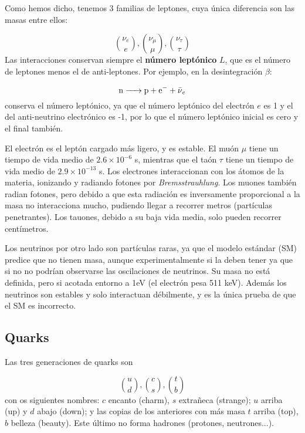 Como hemos dicho, tenemos 3 familias de leptones, cuya única diferencia son las masas entre ellos:

\begin{equation}
	\binom{\nu_e}{e} , 
	\binom{\nu_\mu}{\mu} , 
	\binom{\nu_\tau}{\tau} 
\end{equation}
Las interacciones conservan siempre el \textbf{número leptónico} $L$, que es el número de leptones menos el de anti-leptones. Por ejemplo, en la desintegración $\beta$:

\begin{equation*}
	\ce{n -> p + e^- + \bar{\nu}_e}
\end{equation*}
conserva el número leptónico, ya que el número leptónico del electrón $e$ es 1 y el del anti-neutrino electrónico es -1, por lo que el número leptónico inicial es cero y el final también. 

El electrón es el leptón cargado más ligero, y es estable. El muón $\mu$ tiene un tiempo de vida medio de $2.6 \times 10^{-6}$ s, mientras que el taón $\tau$ tiene un tiempo de vida medio de $2.9 \times 10^{-13}$ s. Los electrones interaccionan con los átomos de la materia, ionizando y radiando fotones por \textit{Bremsstrauhlung}. Los muones también radian fotones, pero debido a que esta radiación es inversamente proporcional a la masa no interacciona mucho, pudiendo llegar a recorrer metros (partículas penetrantes). Los tauones, debido a su baja vida media, solo pueden recorrer centímetros.

Los neutrinos por otro lado son partículas raras, ya que el modelo estándar (SM) predice que no tienen masa, aunque experimentalmente si la deben tener ya que si no no podrían observarse las oscilaciones de neutrinos. Su masa no está definida, pero si acotada entorno a 1eV (el electrón pesa 511 keV). Además los neutrinos son estables y solo interactuan débilmente, y es la única prueba de que el SM es incorrecto.

\subsection{Quarks}

Las tres generaciones de quarks son

\begin{equation}
	\binom{u}{d} , 
	\binom{c}{s} , 
	\binom{t}{b}
\end{equation}
con os siguientes nombres: $c$ encanto (charm), $s$ extrañeca (strange); $u$ arriba (up) y $d$ abajo (down); y las copias de los anteriores con más masa $t$ arriba (top), $b$ belleza (beauty). Este último no forma hadrones (protones, neutrones...).

